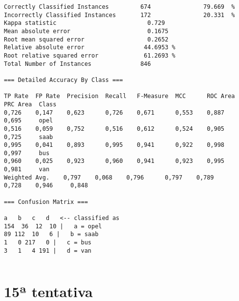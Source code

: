 \documentclass[
	article,			%
	11pt,				%
	oneside,			%
	a4paper,			%
	english,			%
	brazil,				%
	sumario=tradicional
	]{abntex2}
\begin{document}
\begin{lstlisting}
Correctly Classified Instances         674               79.669  %
Incorrectly Classified Instances       172               20.331  %
Kappa statistic                          0.729 
Mean absolute error                      0.1675
Root mean squared error                  0.2652
Relative absolute error                 44.6953 %
Root relative squared error             61.2693 %
Total Number of Instances              846     

=== Detailed Accuracy By Class ===

TP Rate  FP Rate  Precision  Recall   F-Measure  MCC      ROC Area  PRC Area  Class
0,726    0,147    0,623      0,726    0,671      0,553    0,887     0,695     opel
0,516    0,059    0,752      0,516    0,612      0,524    0,905     0,725     saab
0,995    0,041    0,893      0,995    0,941      0,922    0,998     0,997     bus
0,960    0,025    0,923      0,960    0,941      0,923    0,995     0,981     van
Weighted Avg.    0,797    0,068    0,796      0,797    0,789      0,728    0,946     0,848     

=== Confusion Matrix ===

a   b   c   d   <-- classified as
154  36  12  10 |   a = opel
89 112  10   6 |   b = saab
1   0 217   0 |   c = bus
3   1   4 191 |   d = van


\end{lstlisting}

\section{15ª tentativa}
\end{document}
